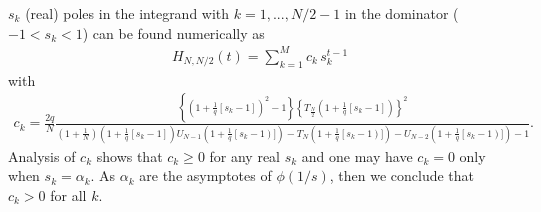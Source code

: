 \documentclass[idelinks, superscriptaddress, amsmath, amssymb, aps, pre]{revtex4-2}
\begin{document}
 $s_{k}$ (real) poles in the integrand with $k=1,...,N/2-1$ in the dominator ($-1<s_k<1$) can be found numerically as
\begin{align}
 H_{N,N/2}(t)=\sum_{k=1}^{M}c_k \,s_k^{t-1}
\label{eq:inv_z_t}
\end{align}
with
\begin{align}
c_k=\frac{2q}{N}\frac{\left\{\left(1+\frac{1}{q}\left[s_k-1\right]\right)^2-1\right\}\left\{T_{\frac{N}{2}}\left(1+\frac{1}{q}\left[s_k-1\right]\right)\right\}^2}{\left(1+\frac{1}{N}\right)\left(1+\frac{1}{q}\left[s_k-1\right]\right)U_{N-1}\left(1+\frac{1}{q}\left[s_k-1\right)]\right)-T_{N}\left(1+\frac{1}{q}\left[s_k-1\right)]\right)-U_{N-2}\left(1+\frac{1}{q}\left[s_k-1\right)]\right)-1}.
\label{eq:ck}
\end{align}
Analysis of $c_k$ shows that $c_k\geq 0$ for any real $s_k$ and one may have $c_k=0$ only when $s_k=\alpha_k$. As $\alpha_k$ are the asymptotes of $\phi(1/s)$, then we conclude that $c_k>0$ for all $k$.
\end{document}
